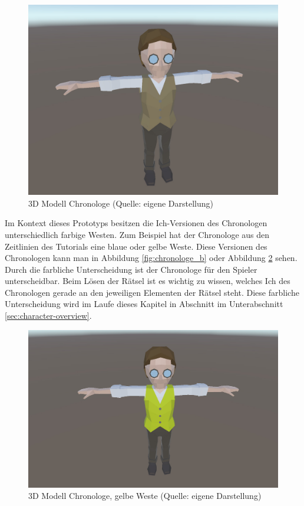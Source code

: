 \begin{figure}[ht]
\centering
\includegraphics[width=0.8\linewidth]{content/pictures/Chronologe.jpg}
\caption{3D Modell Chronologe (Quelle: eigene Darstellung)}
\label{fig:chronologe}
\end{figure}

Im Kontext dieses Prototyps besitzen die Ich-Versionen des Chronologen unterschiedlich farbige Westen. Zum Beispiel hat der Chronologe aus den Zeitlinien des Tutorials eine blaue oder gelbe Weste. Diese Versionen des Chronologen kann man in Abbildung \ref{fig:chronologe_b} oder Abbildung \ref{fig:chronologe_y} sehen. Durch die farbliche Unterscheidung ist der Chronologe für den Spieler unterscheidbar. Beim Lösen der Rätsel ist es wichtig zu wissen, welches Ich des Chronologen gerade an den jeweiligen Elementen der Rätsel steht. Diese farbliche Unterscheidung wird im Laufe dieses Kapitel in Abschnitt  im Unterabschnitt \ref{sec:character-overview}.

\begin{figure}[ht]
\centering
\includegraphics[width=0.8\linewidth]{content/pictures/Chronologe_y.jpg}
\caption{3D Modell Chronologe, gelbe Weste (Quelle: eigene Darstellung)}
\label{fig:chronologe_y}
\end{figure}

